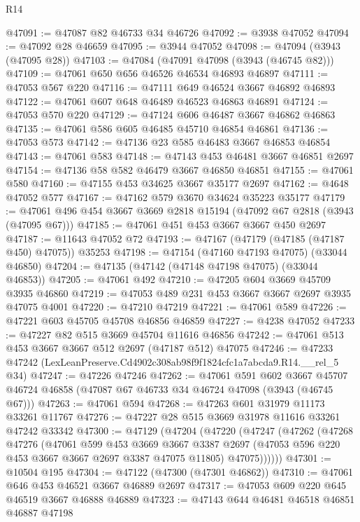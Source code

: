 \begin{lexlean}{R14}
\begin{coremodule}
@47091 := @47087 @82 @46733 @34 @46726
@47092 := @3938 @47052
@47094 := @47092 @28 @46659
@47095 := @3944 @47052
@47098 := @47094 (@3943 (@47095 @28))
@47103 := @47084 (@47091 @47098 (@3943 (@46745 @82)))
@47109 := @47061 @650 @656 @46526 @46534 @46893 @46897
@47111 := @47053 @567 @220
@47116 := @47111 @649 @46524 @3667 @46892 @46893
@47122 := @47061 @607 @648 @46489 @46523 @46863 @46891
@47124 := @47053 @570 @220
@47129 := @47124 @606 @46487 @3667 @46862 @46863
@47135 := @47061 @586 @605 @46485 @45710 @46854 @46861
@47136 := @47053 @573
@47142 := @47136 @23 @585 @46483 @3667 @46853 @46854
@47143 := @47061 @583
@47148 := @47143 @453 @46481 @3667 @46851 @2697
@47154 := @47136 @58 @582 @46479 @3667 @46850 @46851
@47155 := @47061 @580
@47160 := @47155 @453 @34625 @3667 @35177 @2697
@47162 := @4648 @47052 @577
@47167 := @47162 @579 @3670 @34624 @35223 @35177
@47179 := @47061 @496 @454 @3667 @3669 @2818 @15194 (@47092 @67 @2818 (@3943 (@47095 @67)))
@47185 := @47061 @451 @453 @3667 @3667 @450 @2697
@47187 := @11643 @47052 @72
@47193 := @47167 (@47179 (@47185 (@47187 @450) @47075)) @35253
@47198 := @47154 (@47160 @47193 @47075) (@33044 @46850)
@47204 := @47135 (@47142 (@47148 @47198 @47075) (@33044 @46853))
@47205 := @47061 @492
@47210 := @47205 @604 @3669 @45709 @3935 @46860
@47219 := @47053 @489 @231 @453 @3667 @3667 @2697 @3935 @47075 @4001
@47220 := @47210 @47219
@47221 := @47061 @589
@47226 := @47221 @603 @45705 @45708 @46856 @46859
@47227 := @4238 @47052
@47233 := @47227 @82 @515 @3669 @45704 @11616 @46856
@47242 := @47061 @513 @453 @3667 @3667 @512 @2697 (@47187 @512) @47075
@47246 := @47233 @47242 (LexLeanPreserve.Cd4902c308ab98f9f1824cfc1a7abcda9.R14.__rel_5 @34)
@47247 := @47226 @47246
@47262 := @47061
    @591
    @602
    @3667
    @45707
    @46724
    @46858
    (@47087 @67 @46733 @34 @46724 @47098 (@3943 (@46745 @67)))
@47263 := @47061 @594
@47268 := @47263 @601 @31979 @11173 @33261 @11767
@47276 := @47227 @28 @515 @3669 @31978 @11616 @33261 @47242 @33342
@47300 := @47129
    (@47204
      (@47220
        (@47247
          (@47262
            (@47268
              @47276
              (@47061
                @599
                @453
                @3669
                @3667
                @3387
                @2697
                (@47053 @596 @220 @453 @3667 @3667 @2697 @3387 @47075 @11805)
                @47075))))))
@47301 := @10504 @195
@47304 := @47122 (@47300 (@47301 @46862))
@47310 := @47061 @646 @453 @46521 @3667 @46889 @2697
@47317 := @47053 @609 @220 @645 @46519 @3667 @46888 @46889
@47323 := @47143 @644 @46481 @46518 @46851 @46887 @47198

\end{coremodule}
\end{lexlean}
